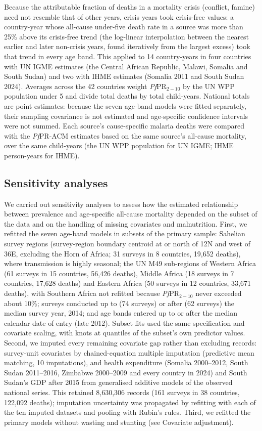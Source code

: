 Because the attributable fraction of deaths in a mortality crisis (conflict, famine) need not resemble that of other years, crisis years took crisis-free values: a country-year whose all-cause under-five death rate in a source was more than 25\% above its crisis-free trend (the log-linear interpolation between the nearest earlier and later non-crisis years, found iteratively from the largest excess) took that trend in every age band. This applied to 14 country-years in four countries with UN IGME estimates (the Central African Republic, Malawi, Somalia and South Sudan) and two with IHME estimates (Somalia 2011 and South Sudan 2024). Averages across the 42 countries weight \textit{Pf}PR$_{2-10}$ by the UN WPP population under 5 and divide total deaths by total child-years. National totals are point estimates: because the seven age-band models were fitted separately, their sampling covariance is not estimated and age-specific confidence intervals were not summed. Each source's cause-specific malaria deaths were compared with the \textit{Pf}PR-ACM estimates based on the same source's all-cause mortality, over the same child-years (the UN WPP population for UN IGME; IHME person-years for IHME).


\subsection*{Sensitivity analyses}

We carried out sensitivity analyses to assess how the estimated relationship between prevalence and age-specific all-cause mortality depended on the subset of the data and on the handling of missing covariates and malnutrition. First, we refitted the seven age-band models in subsets of the primary sample: Sahelian survey regions (survey-region boundary centroid at or north of 12\textdegree N and west of 36\textdegree E, excluding the Horn of Africa; 31 surveys in 8 countries, 19,652 deaths), where transmission is highly seasonal; the UN M49 sub-regions of Western Africa (61 surveys in 15 countries, 56,426 deaths), Middle Africa (18 surveys in 7 countries, 17,628 deaths) and Eastern Africa (50 surveys in 12 countries, 33,671 deaths), with Southern Africa not refitted because \textit{Pf}PR$_{2-10}$ never exceeded about 10\%; surveys conducted up to (74 surveys) or after (62 surveys) the median survey year, 2014; and age bands entered up to or after the median calendar date of entry (late 2012). Subset fits used the same specification and covariate scaling, with knots at quantiles of the subset's own predictor values. Second, we imputed every remaining covariate gap rather than excluding records: survey-unit covariates by chained-equation multiple imputation (predictive mean matching, 10 imputations), and health expenditure (Somalia 2000--2012, South Sudan 2011--2016, Zimbabwe 2000--2009 and every country in 2024) and South Sudan's GDP after 2015 from generalised additive models of the observed national series. This retained 8,630,306 records (161 surveys in 38 countries, 122,092 deaths); imputation uncertainty was propagated by refitting with each of the ten imputed datasets and pooling with Rubin's rules. Third, we refitted the primary models without wasting and stunting (see Covariate adjustment).
